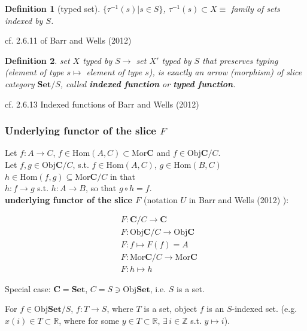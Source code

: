\documentclass[10pt]{amsart}
\newtheorem{definition}{Definition}
\begin{document}
\begin{multicols*}{2}
\begin{definition}[typed set]
	$\lbrace \tau^{-1}(s) | s \in S \rbrace$, $\tau^{-1}(s) \subset X \equiv $ family of sets indexed by $S$. \\
	
\end{definition} 
cf. 2.6.11 of Barr and Wells (2012) \cite{BaWe2012}

\begin{definition}
	set $X$ typed by $S \to $ set $X'$ typed by $S$ that preserves typing (element of type $s\mapsto $ element of type $s$), is exactly an arrow (morphism) of slice category $\mathbf{Set}/S$, called \textbf{indexed function} or \textbf{typed function}.
\end{definition}

cf. 2.6.13 Indexed functions of Barr and Wells (2012) \cite{BaWe2012}

\subsubsection{Underlying functor of the slice $F$}

Let $f: A\to C$, $f\in \text{Hom}(A,C) \subset \text{Mor}\mathbf{C}$ and $f\in \text{Obj}\mathbf{C}/C$.  \\

Let $f,g \in \text{Obj}\mathbf{C}/C$, s.t. $f\in \text{Hom}(A,C)$, $g\in \text{Hom}(B,C)$ \\
$h\in \text{Hom}(f,g) \subseteq \text{Mor}\mathbf{C}/C$ in that \\
$h : f\to g$ s.t. $h:A \to B$, so that $g\circ h = f$. \\

\textbf{underlying functor of the slice $F$} (notation $U$ in Barr and Wells (2012) \cite{BaWe2012}):

\begin{equation}
\begin{aligned}
& F: \mathbf{C} /C \to \mathbf{C} \\ 
& F:\text{Obj}\mathbf{C}/C \to \text{Obj}\mathbf{C} \\ 
& F:f\mapsto F(f) = A \\ 
& F:\text{Mor}\mathbf{C}/C \to \text{Mor}\mathbf{C} \\ 
& F: h \mapsto h 
\end{aligned} 
\end{equation}

Special case: $\mathbf{C} = \textbf{Set}$, $C = S \ni \text{Obj}\textbf{Set}$, i.e. $S$ is a set.

For $f\in \text{Obj}\textbf{Set}/S$, $f: T \to S$, where $T$ is a set, object $f$ is an $S$-indexed set. (e.g. $x(i) \in T \subset \mathbb{R}$, where for some $y\in T \subset \mathbb{R}$, $\exists \, i \in \mathbb{Z}$ s.t. $y\mapsto i$).


\end{multicols*}
\end{document}

